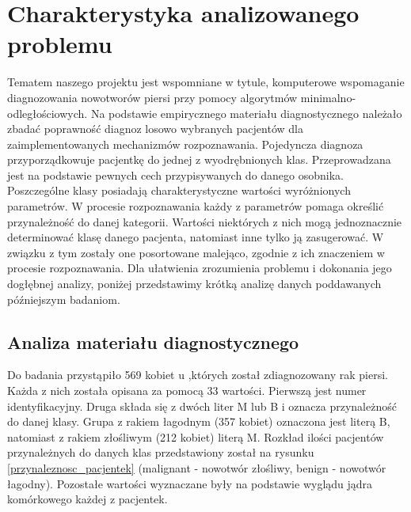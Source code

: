 \documentclass[12pt]{article}
\begin{document}
\section{Charakterystyka analizowanego problemu}
Tematem naszego projektu jest wspomniane w tytule, komputerowe wspomaganie diagnozowania nowotworów piersi przy pomocy algorytmów minimalno-odległościowych. Na podstawie empirycznego materiału diagnostycznego należało zbadać poprawność diagnoz losowo wybranych pacjentów dla zaimplementowanych mechanizmów rozpoznawania.
\newline
\indent Pojedyncza diagnoza przyporządkowuje pacjentkę do jednej z wyodrębnionych klas. Przeprowadzana jest na podstawie pewnych cech przypisywanych do danego osobnika. Poszczególne klasy posiadają charakterystyczne wartości wyróżnionych parametrów. W procesie rozpoznawania każdy z parametrów pomaga określić przynależność do danej kategorii. Wartości niektórych z nich mogą jednoznacznie determinować klasę danego pacjenta, natomiast inne tylko ją zasugerować. W związku z tym zostały one posortowane malejąco, zgodnie z ich znaczeniem w procesie rozpoznawania. 
\newline \indent Dla ułatwienia zrozumienia problemu i dokonania jego dogłębnej analizy, poniżej przedstawimy krótką analizę danych poddawanych późniejszym badaniom.


\subsection{Analiza materiału diagnostycznego}
\indent Do badania przystąpiło 569 kobiet u ,których został zdiagnozowany rak piersi. Każda z nich została opisana za pomocą 33 wartości. Pierwszą jest numer identyfikacyjny. Druga składa się z dwóch liter M lub B i oznacza przynależność do danej klasy.  Grupa z rakiem łagodnym (357 kobiet) oznaczona jest literą B, natomiast z rakiem złośliwym (212 kobiet) literą M. Rozkład ilości pacjentów przynależnych do danych klas przedstawiony został na rysunku \ref{przynaleznosc_pacjentek} (malignant - nowotwór złośliwy, benign - nowotwór łagodny). Pozostałe wartości wyznaczane były na podstawie wyglądu jądra komórkowego każdej z pacjentek.
\newline
\end{document}
